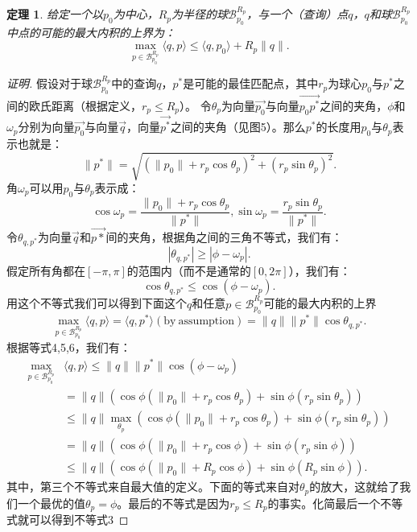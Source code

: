 \documentclass[twocolumn,a4paper]{article}
\begin{document}
\newtheorem{theorem1}{定理}[section]
\begin{theorem1}
给定一个以$p_0$为中心，$R_p$为半径的球$\mathcal{B}_{p_0}^{R_p}$，与一个（查询）点$q$，$q$和球$\mathcal{B}_{p_0}^{R_p}$中点的可能的最大内积的上界为：
\begin{equation}
\max_{p \in \mathcal{B}_{p_0}^{R_p}} \langle q,p \rangle \le \langle q,p_0 \rangle + R_p \|q\|.
\end{equation}

\end{theorem1}
\begin{proof}[证明]
假设对于球$\mathcal{B}_{p_0}^{R_p}$中的查询$q$，$p^*$是可能的最佳匹配点，其中$r_p$为球心$p_0$与$p^*$之间的欧氏距离（根据定义，$r_p \le R_p$）。
令$\theta_p$为向量$\vec{p_0}$与向量$\vec{p_0 p^*}$之间的夹角，$\phi$和$\omega_p$分别为向量$\vec{p_0}$与向量$\vec{q}$，向量$\vec{p^*}$之间的夹角（见图5）。那么$p^*$的长度用$p_0$与$\theta_p$表示也就是：
\begin{equation}
\|p^*\| = \sqrt{(\|p_0\| + r_p\cos\theta_p)^2+(r_p\sin\theta_p)^2}.
\end{equation}
角$\omega_p$可以用$p_0$与$\theta_p$表示成：
\begin{equation}
\cos\omega_p = \frac{\|p_0\|+r_p\cos\theta_p}{\|p^*\|},
\sin\omega_p = \frac{r_p\sin\theta_p}{\|p^*\|}.
\end{equation}
令$\theta_{q,p^*}$为向量$\vec{q}$和$\vec{p*}$间的夹角，根据角之间的三角不等式，我们有：
\begin{equation*}
|\theta_{q,p^*}| \ge |\phi - \omega_p|.
\end{equation*}
假定所有角都在$[-\pi, \pi]$的范围内（而不是通常的$[0, 2\pi]$），我们有：
\begin{equation}
\cos\theta_{q,p^*} \le \cos(\phi - \omega_p).
\end{equation}
用这个不等式我们可以得到下面这个$q$和任意$p \in \mathcal{B}_{p_0}^{R_p}$可能的最大内积的上界
\begin{equation*}
\max_{p \in \mathcal{B}_{p_0}^{R_p}}\langle q,p \rangle = \langle q,p^* \rangle(\mathrm{by\ assumption}) = \|q\|\|p^*\|\cos\theta_{q,p^*}.
\end{equation*}
根据等式4,5,6，我们有：
\begin{align*}
\max_{p \in \mathcal{B}_{p_0}^{R_p}}&\langle q,p \rangle \le \|q\|\|p^*\|\cos(\phi-\omega_p) \\
 &= \|q\|(\cos\phi(\|p_0\|+r_p\cos\theta_p)+\sin\phi(r_p\sin\theta_p))                       \\
 &\le\|q\|\max_{\theta_p}(\cos\phi(\|p_0\| + r_p\cos\theta_p)+\sin\phi(r_p\sin\theta_p))     \\
 &= \|q\|(\cos\phi(\|p_0\|+r_p\cos\phi)+\sin\phi(r_p\sin\phi))                               \\
 &\le \|q\|(\cos\phi(\|p_0\|+R_p\cos\phi)+\sin\phi(R_p\sin\phi)).
\end{align*}
其中，第三个不等式来自最大值的定义。下面的等式来自对$\theta_p$的放大，这就给了我们一个最优的值$\theta_p = \phi$。最后的不等式是因为$r_p \le R_p$的事实。化简最后一个不等式就可以得到不等式3
\end{proof}
\end{document}
